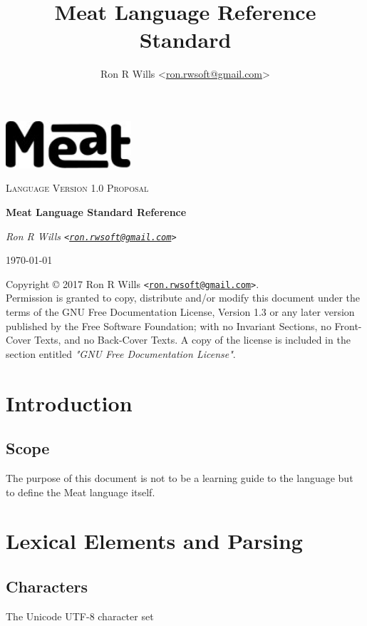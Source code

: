 \documentclass [10pt]{article}
\title {Meat Language Reference Standard}
\author {Ron R Wills \textless\href{mailto:ron.rwsoft@gmail.com}{ron.rwsoft@gmail.com}\textgreater}
\begin{document}
\begin{titlepage}
	\centering
	\includegraphics[width=0.35\textwidth]{meat-logo.jpg}\par\vspace{2cm}
	{\scshape\Large Language Version 1.0 Proposal\par}
	\vspace{1.5cm}
	{\huge\bfseries Meat Language Standard Reference\par}
	\vspace{2cm}
	{\Large\itshape Ron R Wills \texttt{\textless\href{mailto:ron.rwsoft@gmail.com}{ron.rwsoft@gmail.com}\textgreater}}\par

	\vfill

	{\large \today\par}
\end{titlepage}

\noindent{}Copyright \copyright{} 2017 Ron R Wills \texttt{\textless\href{mailto:ron.rwsoft@gmail.com}{ron.rwsoft@gmail.com}\textgreater}.\\[.5 cm]
Permission is granted to copy, distribute and/or modify this document
under the terms of the GNU Free Documentation License, Version 1.3
or any later version published by the Free Software Foundation;
with no Invariant Sections, no Front-Cover Texts, and no Back-Cover Texts.
A copy of the license is included in the section entitled \textit{"GNU
Free Documentation License"}.
\tableofcontents
\newpage
{}

\section {Introduction}
\subsection {Scope}
The purpose of this document is not to be a learning guide to the language but
to define the Meat language itself.

\newpage
\section {Lexical Elements and Parsing}
\subsection {Characters}
The Unicode UTF-8 character set
\end{document}
